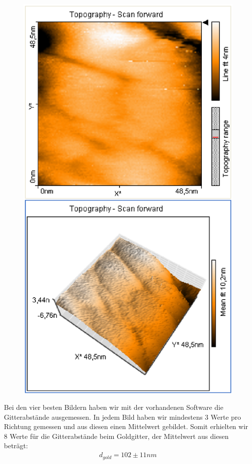 \documentclass[12pt]{article}
\begin{document}
\begin{figure}[H]
\begin{minipage}{0.4\linewidth}
\includegraphics[width=0.9\linewidth]{../plot/data/goldgitter/goldgitter8.eps}
\end{minipage}
\end{figure}

Bei den vier besten Bildern haben wir mit der vorhandenen Software die Gitterabstände ausgemessen. In jedem Bild haben wir mindestens 3 Werte pro Richtung gemessen und aus diesen einen Mittelwert gebildet. Somit erhielten wir 8 Werte für die Gitterabstände beim Goldgitter, der Mittelwert aus diesen beträgt:
\begin{align*}
 d_{gold} = 102 \pm 11 nm
\end{align*}
\end{document}
